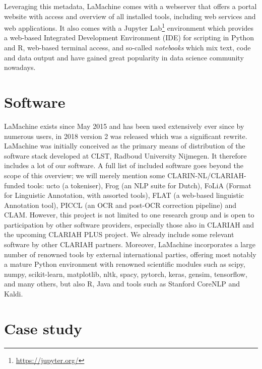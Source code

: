 \documentclass[a4paper,11pt]{article}
\begin{document}
Leveraging this metadata, LaMachine comes with a webserver that offers a portal website with
access and overview of all installed tools, including web services and web applications. It also comes with a
Jupyter Lab\footnote{\url{https://jupyter.org/}} environment which provides a web-based Integrated Development
Environment (IDE) for scripting in Python and R, web-based terminal access, and so-called \emph{notebooks} which mix
text, code and data output and have gained great popularity in data science community nowadays.



\section{Software}

LaMachine exists since May 2015 and has been used extensively ever since by numerous users, in 2018 version 2 was
released which was a significant rewrite. LaMachine was initially conceived as the primary means of distribution of the
software stack developed at CLST, Radboud University Nijmegen. It therefore includes a lot of our software.  A full list
of included software goes beyond the scope of this overview; we will merely mention some CLARIN-NL/CLARIAH-funded tools:
ucto (a tokeniser), Frog (an NLP suite for Dutch), FoLiA (Format for Linguistic Annotation, with assorted tools), FLAT
(a web-based linguistic Annotation tool), PICCL (an OCR and post-OCR correction pipeline) and CLAM. However, this
project is not limited to one research group and is open to participation by other software providers, especially those
also in CLARIAH and the upcoming CLARIAH PLUS project. We already include some relevant software by other CLARIAH
partners. Moreover, LaMachine incorporates a large number of renowned tools by external international parties, offering
most notably a mature Python environment with renowned scientific modules such as scipy, numpy, scikit-learn,
matplotlib, nltk, spacy, pytorch, keras, gensim, tensorflow, and many others, but also R, Java and tools such as
Stanford CoreNLP and Kaldi.

\section{Case study}\label{sec-case}
\end{document}
